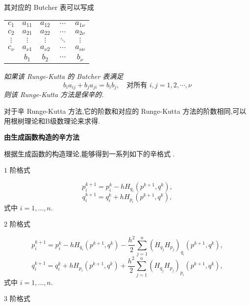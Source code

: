其对应的 Butcher 表可以写成

\begin{center}
  \begin{tabular}{c|cccc}
    $c_1$&$a_{11}$&$a_{12}$&$\cdots$&$a_{1\nu}$\\
    $c_2$&$a_{21}$&$a_{22}$&$\cdots$&$a_{2\nu}$\\
    $\vdots$&$\vdots$&$\vdots$&$\ddots$&$\vdots$\\
    $c_{\nu}$&$a_{\nu 1}$&$a_{\nu 2}$&$\cdots$&$a_{\nu \nu}$\\
    \hline
         &$b_{1}$&$b_{2}$&$\cdots$&$b_{\nu}$
  \end{tabular}
\end{center}

\begin{theorem}
\emph{如果该 Runge-Kutta 的 Butcher 表满足
\begin{equation*}
  b_ia_{ij}+b_ja_{ji}=b_ib_j,\quad \textrm{对所有}\,\, i,j=1,2,\cdots,\nu
\end{equation*}
则该 Runge-Kutta 方法是保辛的.}
\end{theorem}

对于辛 Runge-Kutta 方法,它的阶数和对应的 Runge-Kutta 方法的阶数相同,可以用根树理论和B级数理论来求得.

\noindent \textbf{由生成函数构造的辛方法}

根据生成函数的构造理论,能够得到一系列如下的辛格式 \cite{feng2003sym}.

$1$ 阶格式

\begin{equation*}
	p_i^{k+1}= p_i^{k}-hH_{q_i}(p^{k+1},q^{k}),
\end{equation*}
\begin{equation*}
	q_i^{k+1}= q_i^{k}+hH_{p_i}(p^{k+1},q^{k}),
\end{equation*}
式中 $i=1,\ldots,n$.

$2$ 阶格式

\begin{equation*}
	p_i^{k+1}= p_i^{k}-hH_{q_i}(p^{k+1},q^{k})-\frac{h^2}{2}\sum_{j=1}^n(H_{q_j}H_{p_j})_{q_i}(p^{k+1},q^{k}),
\end{equation*}
\begin{equation*}
	q_i^{k+1}= q_i^{k}+hH_{p_i}(p^{k+1},q^{k})+\frac{h^2}{2}\sum_{j=1}^n(H_{q_j}H_{p_j})_{p_i}(p^{k+1},q^{k}),
\end{equation*}
式中 $i=1,\ldots,n$.

$3$ 阶格式

